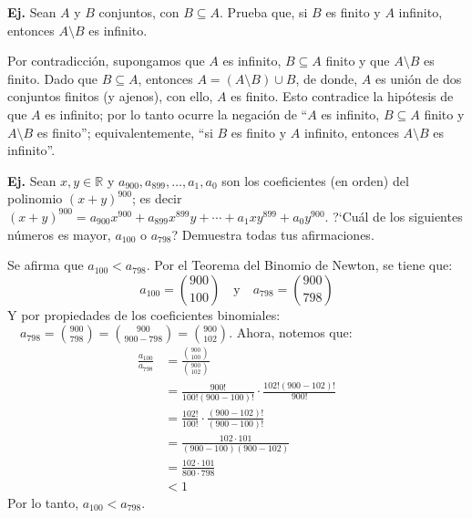 \documentclass[letterpaper,DIV=18,headsepline,13pt]{scrartcl}
\makeatletter
\newcounter{Ejer}
\newcommand{\pts}{}
\newenvironment{ejercicio}[1]{\noindent
    \ifthenelse{\equal{#1}{1}}{\renewcommand{\pts}{\textbf{(#1 pt)}}}{\renewcommand{\pts}{\textbf{(#1 pts)}}}\textbf{Ej. \theEjer} \pts\stepcounter{Ejer}}{\vspace{.3cm}}
\renewenvironment{proof}[1][]{%
        \par\pushQED{\qed}%
        \normalfont\topsep6pt \partopsep0pt %
        \trivlist
        \item[\hskip\labelsep
                \textbf{\textit{Demostración.}}%
        ]#1
        }{%
        \popQED\endtrivlist\@endpefalse
    }
\newenvironment{solucion}[1][]{%
        \par\pushQED{\hfill \lozenge}%
        \normalfont\topsep6pt \partopsep0pt %
        \trivlist
        \item[\hskip\labelsep
                \textbf{\textit{Solución.}}%
        ]#1
        }{%
        \popQED\endtrivlist\@endpefalse
    }
\makeatother
\begin{document}
    \begin{ejercicio}{3}
        Sean $A$  y $B$ conjuntos, con $B \subseteq A$. Prueba que, si $B$ es finito y $A$ infinito, entonces $A \setminus B$ es infinito.
    \end{ejercicio}
    \begin{proof}
        Por contradicción, supongamos que $A$ es infinito, $B \subseteq A$ finito y que $A \setminus B$ es finito. Dado que $B \subseteq A$, entonces $A=(A \setminus B) \cup B$, de donde, $A$ es unión de dos conjuntos finitos (y ajenos), con ello, $A$ es finito. Esto contradice la hipótesis de que $A$ es infinito; por lo tanto ocurre la negación de ``$A$ es infinito, $B \subseteq A$ finito y $A \setminus B$ es finito''; equivalentemente, ``si $B$ es finito y $A$ infinito, entonces $A \setminus B$ es infinito''.
    \end{proof}

    \begin{ejercicio}{3}
        Sean $x,y \in \mathbb{R}$ y $a_{900},a_{899}, \dots ,a_1,a_0$ son los coeficientes (en orden) del polinomio $(x+y)^{900}$; es decir $ (x+y)^{900} = a_{900} x^{900} + a_{899} x^{899}y + \cdots + a_1 xy^{899} + a_0 y^{900}. $ ?`Cuál de los siguientes números es mayor, $a_{100}$ o $a_{798}$? Demuestra todas tus afirmaciones.
    \end{ejercicio}
    \begin{solucion}
        Se afirma que $a_{100}<a_{798}$. Por el Teorema del Binomio de Newton, se tiene que:
        \[ a_{100} = \binom{900}{100} \quad \text{y} \quad a_{798} = \binom{900}{798} \]
        Y por propiedades de los coeficientes binomiales: $\quad a_{798} = \binom{900}{798} = \binom{900}{900-798} = \binom{900}{102}$. Ahora, notemos que:
        \begin{align*}
            \frac{a_{100}}{a_{798}} &= \frac{\binom{900}{100}}{\binom{900}{102}} \\
            &= \frac{900!}{100!(900-100)!} \cdot \frac{102!(900-102)!}{900!} \\
            &= \frac{102!}{100!} \cdot \frac{(900-102)!}{(900-100)!} \\
            &= \frac{102 \cdot 101}{(900-100)(900-102)} \\
            &= \frac{102 \cdot 101}{800 \cdot 798} \\
            &< 1
        \end{align*}
        Por lo tanto, $a_{100} < a_{798}$.
    \end{solucion}
\end{document}
